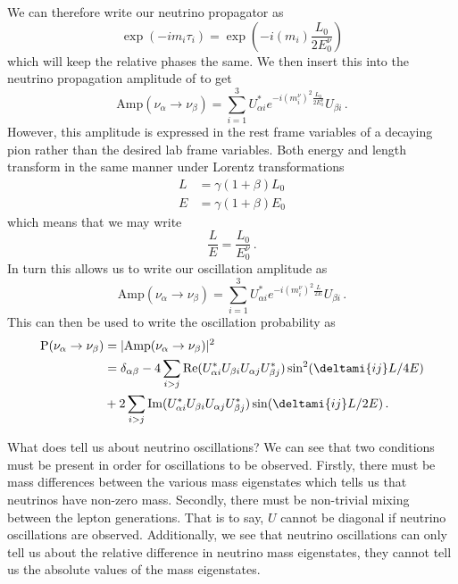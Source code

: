 We can therefore write our neutrino propagator as
\begin{equation}
\exp(-i m_{i} \tau_{i}) = \exp(-i \left(m_{i}\right) \frac{L_{0}}{2E^{\nu}_{0}} )
\end{equation}
which will keep the relative phases the same.
We then insert this into the neutrino propagation amplitude of  to get
\begin{equation}
  \text{Amp}(\nu_{\alpha} \rightarrow \nu_{\beta}) = \sum_{i=1}^{3} U_{\alpha i}^{*} e^{ -i(m_{i}^{\nu})^{2}\frac{L_{0}}{2E^{\nu}_{0}} } U_{\beta i} \, .
\end{equation}
However, this amplitude is expressed in the rest frame variables of a decaying pion rather than the desired lab frame variables.
Both energy and length transform in the same manner under Lorentz transformations
\begin{align}
  L &= \gamma (1 + \beta) L_{0} \\
  E &= \gamma (1 + \beta) E_{0}
\end{align}
which means that we may write
\begin{equation}
\frac{L}{E} = \frac{L_{0}}{E_{0}^{\nu}} \, .
\end{equation}
In turn this allows us to write our oscillation amplitude as
\begin{equation}
  \text{Amp}(\nu_{\alpha} \rightarrow \nu_{\beta}) = \sum_{i=1}^{3} U_{\alpha i}^{*} e^{ -i(m_{i}^{\nu})^{2}\frac{L}{2E} } U_{\beta i} \, .
\end{equation}
This can then be used to write the oscillation probability as
\begin{align}
\begin{split}
  \text{P}(\nu_{\alpha} \rightarrow \nu_{\beta}) &= | \text{Amp}(\nu_{\alpha} \rightarrow \nu_{\beta}) |^{2} \\
  &= \delta_{\alpha \beta} - 4 \sum_{i > j} \text{Re}( U^{*}_{\alpha i} U_{\beta i} U_{\alpha j} U^{*}_{\beta j} ) \sin^{2}(\deltami{ij}L/4E) \\
  & + 2 \sum_{i>j} \text{Im}( U^{*}_{\alpha i} U_{\beta i} U_{\alpha j} U^{*}_{\beta j} ) \sin (\deltami{ij}L/2E) \, .
  \label{eq:oscProbAllOut}
\end{split}
\end{align}

What does  tell us about neutrino oscillations?
We can see that two conditions must be present in order for oscillations to be observed.
Firstly, there must be mass differences between the various mass eigenstates which tells us that neutrinos have non-zero mass.
Secondly, there must be non-trivial mixing between the lepton generations.
That is to say, $U$ cannot be diagonal if neutrino oscillations are observed.
Additionally, we see that neutrino oscillations can only tell us about the relative difference in neutrino mass eigenstates, they cannot tell us the absolute values of the mass eigenstates.

